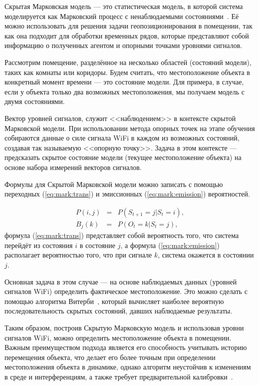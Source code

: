 Скрытая Марковская модель --- это статистическая модель, в которой система моделируется как Марковский процесс с ненаблюдаемыми состояниями~\cite{mor2021systematic}. Её можно использовать для решения задачи геопозиционирования в помещении, так как она подходит для обработки временных рядов, которые представляют собой информацию о полученных агентом и опорными точками уровнями сигналов.

Рассмотрим помещение, разделённое на несколько областей (состояний модели), таких как комнаты или коридоры. Будем считать, что местоположение объекта в конкретный момент времени --- это состояние модели. Для примера, в случае, если у объекта только два возможных местоположения, мы получаем модель с двумя состояниями.

Вектор уровней сигналов, служит <<наблюдением>> в контексте скрытой Марковской модели. При использовании метода опорных точек на этапе обучения собираются данные о силе сигнала WiFi в каждом из возможных состояний, создавая так называемую <<опорную точку>>. Задача в этом контексте --- предсказать скрытое состояние модели (текущее местоположение объекта) на основе набора измерений векторов сигналов.

Формулы для Скрытой Марковской модели можно записать с помощью переходных (\ref{eq:mark:trans}) и эмиссионных (\ref{eq:mark:emission}) вероятностей.

\begin{eqnarray}
    P(i, j) &=& P(S_{t+1}=j|S_t=i), \label{eq:mark:trans} \\
    B_j(k) &=& P(O_t=k|S_t=j), \label{eq:mark:emission}
\end{eqnarray}
формула (\ref{eq:mark:trans}) представляет собой вероятность того, что система перейдёт из состояния $i$ в состояние $j$, а формула (\ref{eq:mark:emission}) располагает вероятностью того, что при сигнале $k$, система окажется в состоянии $j$.

Основная задача в этом случае --- на основе наблюдаемых данных (уровней сигналов WiFi) определить фактическое местоположение. Это можно сделать с помощью алгоритма Витерби~\cite{dong2020sequential}, который вычисляет наиболее вероятную последовательность скрытых состояний, давших наблюдаемые результаты.

Таким образом, построив Скрытую Марковскую модель и использовав уровни сигналов WiFi, можно определить местоположение объекта в помещении. Важным преимуществом подхода является его способность учитывать историю перемещения объекта, что делает его более точным при определении местоположения объекта в динамике, однако алгоритм неустойчив к изменениям в среде и интерференциям, а также требует предварительной калибровки~\cite{rudic2020geometry}.

